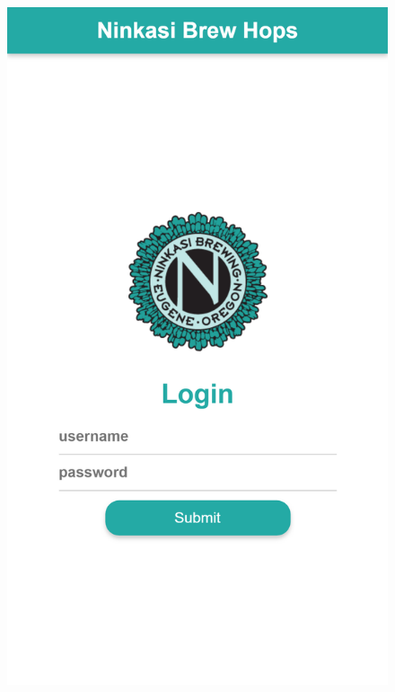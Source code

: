     \begin{figure}[H]
        \begin{multicols}{3}
            \includegraphics[width=\linewidth]{./img/mobile-login-page.png}

\end{multicols}
\end{figure}
